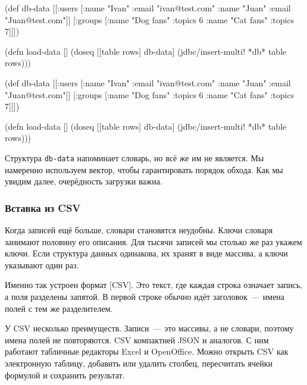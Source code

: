 
\ifnarrow

\begin{english}
  \begin{clojure}
(def db-data
  [[:users [{:name "Ivan"
             :email "ivan@test.com"}
            {:name "Juan"
             :email "Juan@test.com"}]]
  [:groups [{:name "Dog fans"
             :topics 6}
            {:name "Cat fans"
             :topics 7}]]])

(defn load-data []
 (doseq [[table rows] db-data]
  (jdbc/insert-multi! *db* table rows)))
  \end{clojure}
\end{english}

\else

\begin{english}
  \begin{clojure}
(def db-data
  [[:users [{:name "Ivan" :email "ivan@test.com"}
            {:name "Juan" :email "Juan@test.com"}]]
   [:groups [{:name "Dog fans" :topics 6}
             {:name "Cat fans" :topics 7}]]])

(defn load-data []
  (doseq [[table rows] db-data]
    (jdbc/insert-multi! *db* table rows)))
  \end{clojure}
\end{english}

\fi

Структура \verb|db-data| напоминает словарь, но всё же им не является. Мы
намеренно используем вектор, чтобы гарантировать порядок обхода. Как мы увидим
далее, очерёдность загрузки важна.

\subsubsection*{Вставка из CSV}


Когда записей ещё больше, словари становятся неудобны. Ключи словаря занимают
половину его описания. Для тысячи записей мы столько же раз укажем ключи. Если
структура данных одинакова, их хранят в виде массива, а ключи указывают один
раз.

Именно так устроен формат [CSV].
Это текст, где каждая строка означает запись, а поля разделены запятой.
В первой строке обычно идёт заголовок~--- имена полей с тем же разделителем.

У CSV несколько преимуществ. Записи~--- это массивы, а не словари, поэтому имена
полей не повторяются. CSV компактней JSON и аналогов. С ним работают табличные
редакторы Excel и OpenOffice. Можно открыть CSV как электронную таблицу,
добавить или удалить столбец, пересчитать ячейки формулой и сохранить результат.

